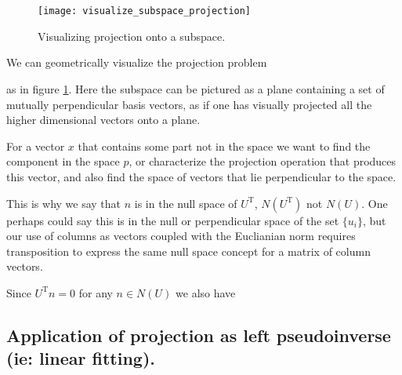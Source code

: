 \documentclass{article}      %
\title{} %
\author{Peeter Joot}         %
\newcommand{\T}[0]{\text{T}}
\begin{document}

\maketitle{}

\section{}


\begin{figure}[htp]
\centering
\texttt{[image: visualize\_subspace\_projection]}
\caption{Visualizing projection onto a subspace.}\label{fig:Projection_subspace}
\end{figure}

We can geometrically visualize the projection problem 

as in figure \ref{fig:Projection_subspace}.  Here
the subspace can be pictured
as a plane containing a set of mutually perpendicular basis vectors, as if
one has visually projected all the higher dimensional vectors onto a plane.

For a vector $x$ that contains some part not in the space we want to find
the component in the space $p$, or characterize the projection operation
that produces this vector, and also find the space of vectors that lie
perpendicular to the space.




This is why we say that $n$ is in the null space of $U^\T$,
$N(U^\T)$ not $N(U)$.  One perhaps could say this is in the null
or perpendicular space of the set $\{u_i\}$, but our use of columns as
vectors coupled with the Euclianian norm requires transposition to express
the same null space concept for a matrix of column vectors.

Since $U^\T n = 0$ for any $n \in N(U)$ we also have


















\subsection{ Application of projection as left pseudoinverse (ie: linear fitting). }
\end{document}
